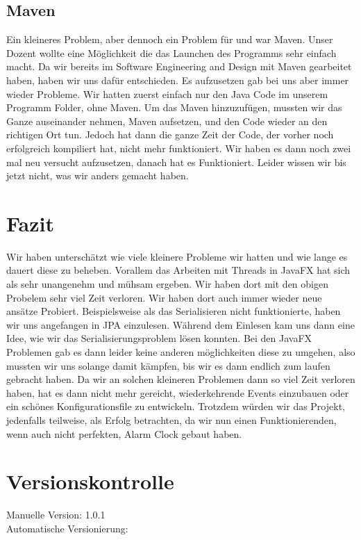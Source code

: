 \documentclass[11pt,titelpage]{scrartcl}
\begin{document}
\subsection{Maven}
Ein kleineres Problem, aber dennoch ein Problem für und war Maven. Unser Dozent wollte eine Möglichkeit die das Launchen des Programms sehr einfach macht. Da wir bereits im Software Engineering and Design mit Maven gearbeitet
haben, haben wir uns dafür entschieden. Es aufzusetzen gab bei uns aber immer wieder Probleme. Wir hatten zuerst einfach nur den Java Code im unserem Programm Folder, ohne Maven. Um das Maven hinzuzufügen, mussten wir das Ganze
auseinander nehmen, Maven aufsetzen, und den Code wieder an den richtigen Ort tun. Jedoch hat dann die ganze Zeit der Code, der vorher noch erfolgreich kompiliert hat, nicht mehr funktioniert. Wir haben es dann noch zwei mal neu
versucht aufzusetzen, danach hat es Funktioniert. Leider wissen wir bis jetzt nicht, was wir anders gemacht haben.

\section{Fazit}
Wir haben unterschätzt wie viele kleinere Probleme wir hatten und wie lange es dauert diese zu beheben. Vorallem das Arbeiten mit Threads in JavaFX hat sich als sehr
unangenehm und mühsam ergeben. Wir haben dort mit den obigen Probelem sehr viel Zeit verloren. Wir haben dort auch immer wieder neue ansätze Probiert. Beispielsweise als das
Serialisieren nicht funktionierte, haben wir uns angefangen in JPA einzulesen. Während dem Einlesen kam uns dann eine Idee, wie wir das Serialisierungsproblem lösen konnten.
Bei den JavaFX Problemen gab es dann leider keine anderen möglichkeiten diese zu umgehen, also mussten wir uns solange damit kämpfen, bis wir es dann endlich zum laufen
gebracht haben.
Da wir an solchen kleineren Problemen dann so viel Zeit verloren haben, hat es dann nicht mehr gereicht, wiederkehrende Events einzubauen oder ein schönes Konfigurationsfile
zu entwickeln.
Trotzdem würden wir das Projekt, jedenfalls teilweise, als Erfolg betrachten, da wir nun einen Funktionierenden, wenn auch nicht perfekten, Alarm Clock gebaut haben.

\section{Versionskontrolle}
Manuelle Version: 1.0.1
\\

\noindent
Automatische Versionierung:
\immediate{}

\immediate{}
\end{document}
